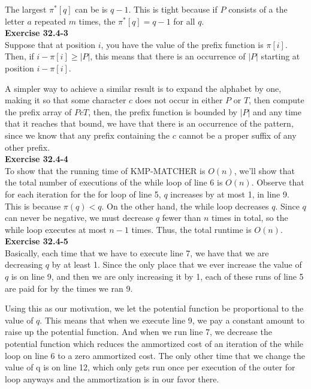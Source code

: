 \documentclass{article}
\begin{document}
The largest $\pi^*[q]$ can be is $q-1$.  This is tight because if $P$ consists of a the letter $a$ repeated $m$ times, the $\pi^*[q] = q-1$ for all $q$. \\



\noindent\textbf{Exercise 32.4-3}\\

Suppose that at position $i$, you have the value of the prefix function is $\pi[i]$. Then, if $i-\pi[i] \ge|P| $, this means that there is an occurrence of $|P|$ starting at position $i-\pi[i]$. 

A simpler way to achieve a similar result is to expand the alphabet by one, making it so that some character $c$ does not occur in either $P$ or $T$, then compute the prefix array of $PcT$, then, the prefix function is bounded by $|P|$ and any time that it reaches that bound, we have that there is an occurrence of the pattern, since we know that any prefix containing the $c$ cannot be a proper suffix of any other prefix.\\

\noindent\textbf{Exercise 32.4-4}\\

To show that the running time of KMP-MATCHER is $O(n)$, we'll show that the total number of executions of the while loop of line 6 is $O(n)$.  Observe that for each iteration for the for loop of line 5, $q$ increases by at most 1, in line 9.  This is because $\pi(q) < q$.  On the other hand, the while loop decreases $q$.  Since $q$ can never be negative, we must decrease $q$ fewer than $n$ times in total, so the while loop executes at most $n-1$ times.  Thus, the total runtime is $O(n)$. \\


\noindent\textbf{Exercise 32.4-5}\\

Basically, each time that we have to execute line 7, we have that we are decreasing $q$ by at least 1. Since the only place that we ever increase the value of $q$ is on line 9, and then we are only increasing it by 1, each of these runs of line 5 are paid for by the times we ran 9.

Using this as our motivation, we let the potential function be proportional to the value of $q$. This means that when we execute line 9, we pay a constant amount to raise up the potential function. And when we run line 7, we decrease the potential function which reduces the ammortized cost of an iteration of the while loop on line 6 to a zero ammortized cost. The only other time that we change the value of q is on line 12, which only gets run once per execution of the outer for loop anyways and the ammortization is in our favor there.
\end{document}
